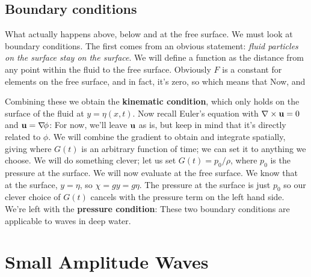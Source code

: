 \documentclass[12pt]{book}
\begin{document}
\subsection{Boundary conditions}
What actually happens above, below and at the free surface.  We must look at boundary conditions.  The first comes from an obvious statement: \textit{fluid particles on the surface stay on the surface}.  We will define a function
 as the distance from any point within the fluid to the free surface.  Obviously $F$ is a constant for elements on the free surface, and in fact, it's zero, so
 which means that
 Now,
 and

Combining these we obtain the \textbf{kinematic condition},
which only holds on the surface of the fluid at $y=\eta(x,t)$.  Now recall Euler's equation with $\curl\vec u = 0$ and $\vec u = \grad\phi$:
For now, we'll leave $\mathbf{u}$ as is, but keep in mind that it's directly related to $\phi$.  We will combine the gradient to obtain
 and integrate spatially, giving
 where $G(t)$ is an arbitrary function of time; we can set it to anything we choose.  We will do something clever; let us set $G(t) = p_0 / \rho$, where $p_0$ is the pressure at the surface.  We will now evaluate  at the free surface.  We know that at the surface, $y=\eta$, so $\chi=gy=g\eta$.  The pressure at the surface is just $p_0$ so our clever choice of $G(t)$ cancels with the pressure term on the left hand side.  We're left with the \textbf{pressure condition}:
These two boundary conditions are applicable to waves in deep water.




\section{Small Amplitude Waves}
\end{document}
